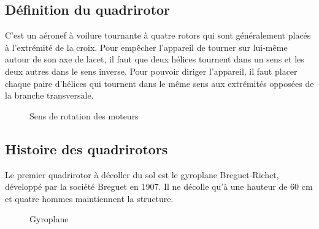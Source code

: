 \subsection{Définition du quadrirotor}
C'est un aéronef à voilure tournante à quatre rotors qui sont généralement placés à l'extrémité de la croix. Pour empêcher l'appareil de tourner sur lui-même autour de son axe de lacet, il faut que deux hélices tournent dans un sens et les deux autres dans le sens inverse\cite{Wikipidea}. Pour pouvoir diriger l'appareil, il faut placer chaque paire d'hélices qui tournent dans le même sens aux extrémités opposées de la branche transversale.
\begin{figure}[H] 
\begin{center} 
	\centering
\end{center}
\caption{Sens de rotation des moteurs }
\end{figure}
\subsection{Histoire des quadrirotors}
Le premier quadrirotor à décoller du sol est le gyroplane Breguet-Richet, développé par la société Breguet en 1907. Il ne décolle qu'à une hauteur de 60 cm et quatre hommes maintiennent la structure\cite{Wikipidea}. 
\begin{figure}[H] 
\begin{center} 
	\centering
	
\end{center}
\caption{Gyroplane }
\end{figure}

